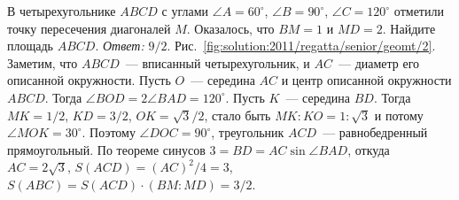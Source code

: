 \problem
В четырехугольнике $ABCD$ с углами
$\angle A = 60^{\circ}$, $\angle B = 90^{\circ}$, $\angle C = 120^{\circ}$
отметили точку пересечения диагоналей $M$.
Оказалось, что $BM = 1$ и $MD = 2$.
Найдите площадь $ABCD$.
%
\label{solution:2011/regatta/senior/geomt/2}%
\emph{Ответ:} $9 / 2$.
Рис.~\ref{fig:solution:2011/regatta/senior/geomt/2}.
Заметим, что $ABCD$~--- вписанный четырехугольник, и $AC$~--- диаметр его
описанной окружности.
Пусть $O$~--- середина $AC$ и центр описанной окружности $ABCD$.
Тогда $\angle BOD = 2 \angle BAD = 120^{\circ}$.
Пусть $K$~--- середина $BD$.
Тогда $MK = 1 / 2$, $KD = 3 / 2$, $OK = \sqrt{3} / 2$, стало быть
$MK : KO = 1 : \sqrt{3}$ и потому $\angle MOK = 30^{\circ}$.
Поэтому $\angle DOC = 90^{\circ}$, треугольник $ACD$~--- равнобедренный
прямоугольный.
По теореме синусов $3 = BD = AC \sin \angle BAD$, откуда
$AC = 2 \sqrt{3}$, $S(ACD) = (AC)^2 / 4 = 3$,
$S(ABC) = S(ACD) \cdot (BM : MD) = 3 / 2$.
\endproblem
